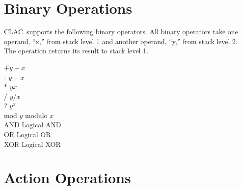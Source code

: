 \documentclass{report}
\newcommand{\CLAC}{CLAC}
\begin{document}
\chapter{Binary Operations}

\CLAC\ supports the following binary operators. All binary operators
take one operand, ``x,'' from stack level 1 and another operand, ``y,''
from stack level 2. The operation returns its result to stack level 1.

\begin{tabbing}
\hspace*{3em}\=+\hspace{3em}\=$y + x$\\
\>             -\>            $y - x$\\
\>             *\>            $y   x$\\
\>             /\>            $y / x$\\
\>             ?\>            $y^{x}$\\
\>             mod\>          $y$ modulo $x$\\
\>             AND\>          Logical AND\\
\>             OR\>           Logical OR\\
\>             XOR\>          Logical XOR\\
\end{tabbing}

\chapter{Action Operations}
\end{document}

